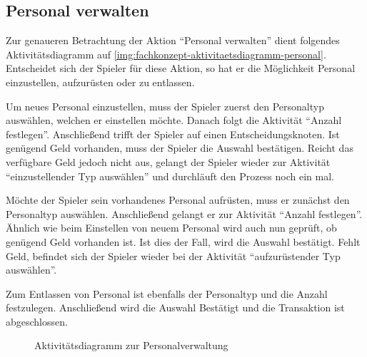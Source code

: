 \subsection{Personal verwalten}
\label{sec:fachkonzept-aktivitaetsdiagramm}

Zur genaueren Betrachtung der Aktion “Personal verwalten” dient folgendes Aktivitätsdiagramm auf \vref{img:fachkonzept-aktivitaetsdiagramm-personal}. Entscheidet sich der Spieler für diese Aktion, so hat er die Möglichkeit Personal einzustellen, aufzurüsten oder zu entlassen. 

Um neues Personal einzustellen, muss der Spieler zuerst den Personaltyp auswählen, welchen er einstellen möchte. Danach folgt die Aktivität “Anzahl festlegen”. Anschließend trifft der Spieler auf einen Entscheidungsknoten. Ist genügend Geld vorhanden, muss der Spieler die Auswahl bestätigen. Reicht das verfügbare Geld jedoch nicht aus, gelangt der Spieler wieder zur Aktivität “einzustellender Typ auswählen” und durchläuft den Prozess noch ein mal. 

Möchte der Spieler sein vorhandenes Personal aufrüsten, muss er zunächst den Personaltyp auswählen. Anschließend gelangt er zur Aktivität “Anzahl festlegen”. Ähnlich wie beim Einstellen von neuem Personal wird auch nun geprüft, ob genügend Geld vorhanden ist. Ist dies der Fall, wird die Auswahl bestätigt. Fehlt Geld, befindet sich der Spieler wieder bei der Aktivität “aufzurüstender Typ auswählen”.

Zum Entlassen von Personal ist ebenfalls der Personaltyp und die Anzahl festzulegen. Anschließend wird die Auswahl Bestätigt und die Transaktion ist abgeschlossen. 

\begin{figure}[h]
  \centering
  \caption{Aktivitätsdiagramm zur Personalverwaltung}
  \label{img:fachkonzept-aktivitaetsdiagramm-personal}
\end{figure}
